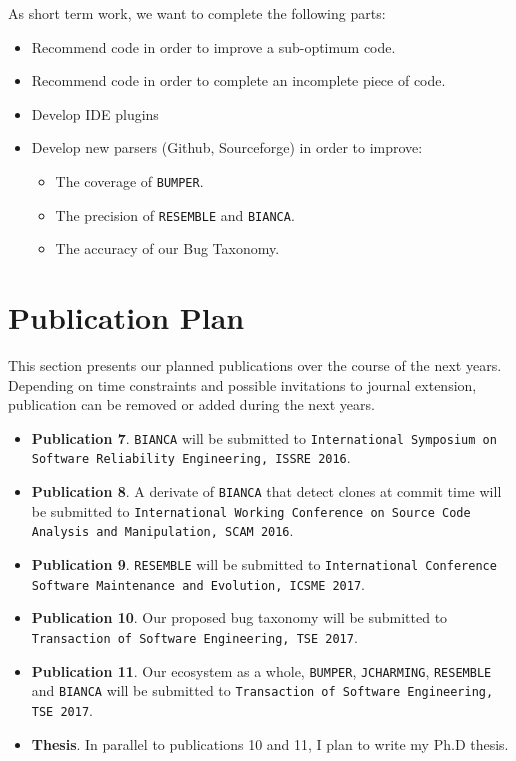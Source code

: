 As short term work, we want to complete the following parts:

\begin{itemize}
	\item Recommend code in order to improve a sub-optimum code.
	\item Recommend code in order to complete an incomplete piece of code.
	\item Develop IDE plugins
	\item Develop new parsers (Github, Sourceforge) in order to improve:
	\begin{itemize}
		\item The coverage of {\tt BUMPER}.
		\item The precision of {\tt RESEMBLE} and {\tt BIANCA}.
		\item The accuracy of our Bug Taxonomy.
	\end{itemize}
\end{itemize}

\section{Publication Plan\label{sec:publication-plan}}

This section presents our planned publications over the course of the next years.
Depending on time constraints and possible invitations to journal extension, publication can be removed or added during the next years.

\begin{itemize}

	\item {\bf Publication 7}. {\tt BIANCA} will be submitted to {\tt International Symposium on Software Reliability Engineering, ISSRE 2016}.
	\item {\bf Publication 8}. A derivate of {\tt BIANCA} that detect clones at commit time will be submitted to {\tt International Working Conference on Source Code Analysis and Manipulation, SCAM 2016}.
	\item {\bf Publication 9}. {\tt RESEMBLE} will be submitted to {\tt International Conference Software Maintenance and Evolution, ICSME 2017}.
	\item {\bf Publication 10}. Our proposed bug taxonomy will be submitted to {\tt Transaction of Software Engineering, TSE 2017}.
	\item {\bf Publication 11}. Our ecosystem as a whole, {\tt BUMPER}, {\tt JCHARMING}, {\tt RESEMBLE} and {\tt BIANCA} will be submitted to {\tt Transaction of Software Engineering, TSE 2017}.
	\item {\bf Thesis}. In parallel to publications 10 and 11, I plan to write my Ph.D thesis.
\end{itemize}
